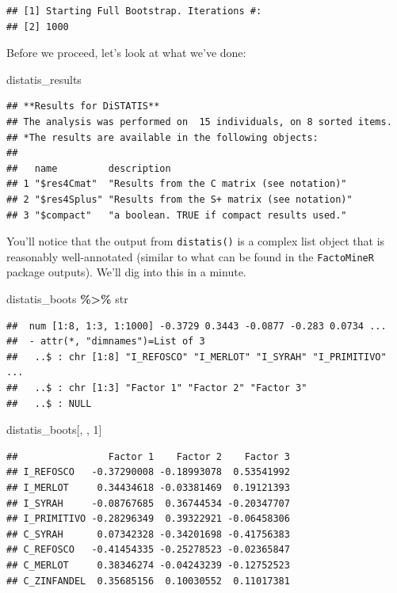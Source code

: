 \documentclass[
]{book}
\newenvironment{Shaded}{\begin{snugshade}}{\end{snugshade}}
\newcommand{\DecValTok}[1]{\textcolor[rgb]{0.00,0.00,0.81}{#1}}
\newcommand{\NormalTok}[1]{#1}
\newcommand{\SpecialCharTok}[1]{\textcolor[rgb]{0.81,0.36,0.00}{\textbf{#1}}}
\begin{document}
\begin{verbatim}
## [1] Starting Full Bootstrap. Iterations #: 
## [2] 1000
\end{verbatim}

Before we proceed, let's look at what we've done:

\begin{Shaded}
\begin{Highlighting}[]
\NormalTok{distatis\_results}
\end{Highlighting}
\end{Shaded}

\begin{verbatim}
## **Results for DiSTATIS**
## The analysis was performed on  15 individuals, on 8 sorted items.
## *The results are available in the following objects:
## 
##   name         description                                
## 1 "$res4Cmat"  "Results from the C matrix (see notation)" 
## 2 "$res4Splus" "Results from the S+ matrix (see notation)"
## 3 "$compact"   "a boolean. TRUE if compact results used."
\end{verbatim}

You'll notice that the output from \texttt{distatis()} is a complex list object that is reasonably well-annotated (similar to what can be found in the \texttt{FactoMineR} package outputs). We'll dig into this in a minute.

\begin{Shaded}
\begin{Highlighting}[]
\NormalTok{distatis\_boots }\SpecialCharTok{\%\textgreater{}\%}\NormalTok{ str}
\end{Highlighting}
\end{Shaded}

\begin{verbatim}
##  num [1:8, 1:3, 1:1000] -0.3729 0.3443 -0.0877 -0.283 0.0734 ...
##  - attr(*, "dimnames")=List of 3
##   ..$ : chr [1:8] "I_REFOSCO" "I_MERLOT" "I_SYRAH" "I_PRIMITIVO" ...
##   ..$ : chr [1:3] "Factor 1" "Factor 2" "Factor 3"
##   ..$ : NULL
\end{verbatim}

\begin{Shaded}
\begin{Highlighting}[]
\NormalTok{distatis\_boots[, , }\DecValTok{1}\NormalTok{]}
\end{Highlighting}
\end{Shaded}

\begin{verbatim}
##                Factor 1    Factor 2    Factor 3
## I_REFOSCO   -0.37290008 -0.18993078  0.53541992
## I_MERLOT     0.34434618 -0.03381469  0.19121393
## I_SYRAH     -0.08767685  0.36744534 -0.20347707
## I_PRIMITIVO -0.28296349  0.39322921 -0.06458306
## C_SYRAH      0.07342328 -0.34201698 -0.41756383
## C_REFOSCO   -0.41454335 -0.25278523 -0.02365847
## C_MERLOT     0.38346274 -0.04243239 -0.12752523
## C_ZINFANDEL  0.35685156  0.10030552  0.11017381
\end{verbatim}
\end{document}
